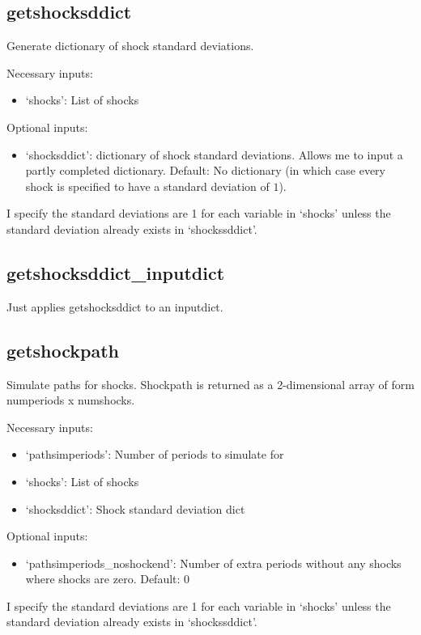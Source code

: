 \documentclass{article}
\theoremstyle{definition}
\begin{document}
\subsection{getshocksddict}
Generate dictionary of shock standard deviations.

Necessary inputs:
\begin{itemize}
    \item `shocks': List of shocks
\end{itemize}

Optional inputs:
\begin{itemize}
    \item `shocksddict': dictionary of shock standard deviations. Allows me to input a partly completed dictionary. Default: No dictionary (in which case every shock is specified to have a standard deviation of $1$).
\end{itemize}

I specify the standard deviations are 1 for each variable in `shocks' unless the standard deviation already exists in `shockssddict'.

\subsection{getshocksddict\_inputdict}
Just applies getshocksddict to an inputdict.

\subsection{getshockpath}
Simulate paths for shocks. Shockpath is returned as a 2-dimensional array of form numperiods x numshocks.

Necessary inputs:
\begin{itemize}
    \item `pathsimperiods': Number of periods to simulate for
    \item `shocks': List of shocks
    \item `shocksddict': Shock standard deviation dict
\end{itemize}

Optional inputs:
\begin{itemize}
    \item `pathsimperiods\_noshockend': Number of extra periods without any shocks where shocks are zero. Default: 0
\end{itemize}

I specify the standard deviations are 1 for each variable in `shocks' unless the standard deviation already exists in `shockssddict'.
\end{document}
